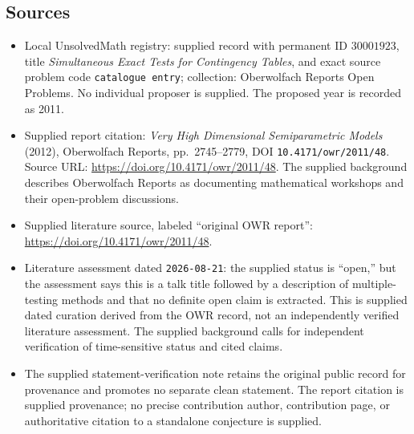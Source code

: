 \documentclass[11pt]{article}
\begin{document}
\subsection{Sources}
\begin{itemize}
\item Local UnsolvedMath registry: supplied record with permanent ID \(30001923\), title \emph{Simultaneous Exact Tests for Contingency Tables}, and exact source problem code \texttt{catalogue entry}; collection: Oberwolfach Reports Open Problems. No individual proposer is supplied. The proposed year is recorded as 2011.
\item Supplied report citation: \emph{Very High Dimensional Semiparametric Models} (2012), Oberwolfach Reports, pp.\ 2745--2779, DOI \texttt{10.4171/owr/2011/48}. Source URL: \url{https://doi.org/10.4171/owr/2011/48}. The supplied background describes Oberwolfach Reports as documenting mathematical workshops and their open-problem discussions.
\item Supplied literature source, labeled ``original OWR report'': \url{https://doi.org/10.4171/owr/2011/48}.
\item Literature assessment dated \texttt{2026-08-21}: the supplied status is ``open,'' but the assessment says this is a talk title followed by a description of multiple-testing methods and that no definite open claim is extracted. This is supplied dated curation derived from the OWR record, not an independently verified literature assessment. The supplied background calls for independent verification of time-sensitive status and cited claims.
\item The supplied statement-verification note retains the original public record for provenance and promotes no separate clean statement. The report citation is supplied provenance; no precise contribution author, contribution page, or authoritative citation to a standalone conjecture is supplied.
\end{itemize}
\end{document}
